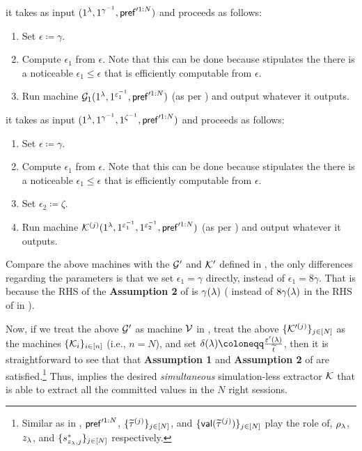  it takes as input $(1^\lambda, 1^{\gamma^{-1}}, \mathsf{pref}'^{1:N})$ and proceeds as follows:
\begin{enumerate}
\item
Set $\epsilon\coloneqq \gamma$.
\item
Compute $\epsilon_1$ from $\epsilon$. Note that this can be done because  stipulates the there is a noticeable $\epsilon_1 \le \epsilon$ that is efficiently computable from $\epsilon$.
\item
Run machine $\mathcal{G}_1(1^\lambda, 1^{\varepsilon_1^{-1}}, \mathsf{pref}'^{1:N})$ (as per ) and output whatever it outputs.
\end{enumerate}

 it takes as input $(1^\lambda,1^{\gamma^{-1}}, 1^{\zeta^{-1}},\mathsf{pref}'^{1:N})$ and proceeds as follows:
\begin{enumerate}
\item
Set $\epsilon\coloneqq \gamma$.
\item
Compute $\epsilon_1$ from $\epsilon$. Note that this can be done because  stipulates the there is a noticeable $\epsilon_1 \le \epsilon$ that is efficiently computable from $\epsilon$.
\item
Set $\epsilon_2 \coloneqq \zeta$.
\item
Run machine $\mathcal{K}^{(j)}(1^\lambda, 1^{\varepsilon_1^{-1}}, 1^{\varepsilon_2^{-1}}, \mathsf{pref}'^{1:N})$ (as per ) and output whatever it outputs.
\end{enumerate}

Compare the above machines with the $\mathcal{G}'$ and $\mathcal{K}'$ defined in , the only differences regarding the parameters is that we set $\epsilon_1 = \gamma$ directly, instead of $\epsilon_1 = 8\gamma$. That is because the RHS of the {\bf Assumption 2} of  is $\gamma(\lambda)$ ( instead of $8\gamma(\lambda)$ in the RHS of  in ).
   


Now, if we treat the above $\mathcal{G}'$ as machine $\mathcal{V}$ in , treat the above $\{\mathcal{K}'^{(j)}\}_{j \in [N]}$ as the machines $\{\mathcal{K}_i\}_{i \in [n]}$ (i.e., $n = N$), and set $\delta(\secpar) \coloneqq \frac{\epsilon'(\secpar)}{\tilde{t}}$, then it is straightforward to see that that {\bf Assumption 1} and {\bf Assumption 2} of  are satisfied.\footnote{Similar as in , $\mathsf{pref}'^{1:N}$, $\{\widetilde{\tau}^{(j)}\}_{j\in [N]}$, and $\{\mathsf{val}(\widetilde{\tau}^{(j)})\}_{j \in [N]}$  play the role of, $\rho_\lambda$, $z_\lambda$, and $\{s^*_{z_\lambda, j}\}_{j \in [N]}$ respectively.} Thus,  implies the desired {\em simultaneous} simulation-less extractor $\mathcal{K}$ that is able to extract all the committed values in the $N$ right sessions.

